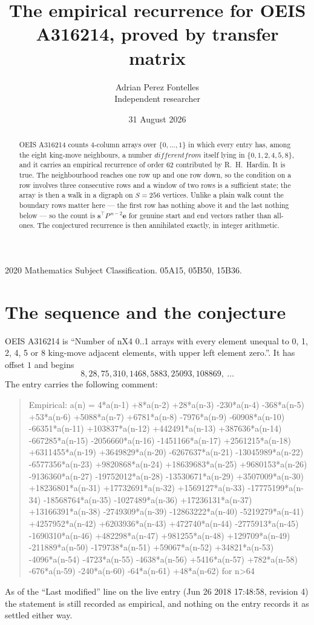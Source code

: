\documentclass[11pt,a4paper]{article}
\title{The empirical recurrence for OEIS A316214, proved by transfer matrix}
\author{Adrian Perez Fontelles\\ \small Independent researcher}
\date{31 August 2026}
\theoremstyle{plain}
\theoremstyle{definition}
\begin{document}
\maketitle

\begin{abstract}
OEIS A316214 counts $4$-column arrays over $\{0,\dots,1\}$ in which every entry has,
among the eight king-move neighbours, a number $different from$ itself lying in $\{0,1,2,4,5,8\}$, and it carries an empirical
recurrence of order $62$ contributed by R.~H.~Hardin. It is true. The neighbourhood
reaches one row up and one row down, so the condition on a row involves three consecutive
rows and a window of two rows is a sufficient state; the array is then a walk in a digraph
on $S=256$ vertices. Unlike a plain walk count the boundary rows matter here --- the first
row has nothing above it and the last nothing below --- so the count is
$\mathbf{s}^{\!\top}P^{\,n-2}\mathbf{e}$ for genuine start and end vectors rather than
all-ones. The conjectured recurrence is then annihilated exactly, in integer arithmetic.
\end{abstract}

\noindent\small 2020 Mathematics Subject Classification. 05A15, 05B50, 15B36.\normalsize

\section{The sequence and the conjecture}

OEIS A316214 is ``Number of nX4 0..1 arrays with every element unequal to 0, 1, 2, 4, 5 or 8 king-move adjacent elements, with upper left element zero.''. It has offset
$1$ and begins
\[
8, 28, 75, 310, 1468, 5883, 25093, 108869,\ \dots
\]
The entry carries the following comment:
\begin{quote}\small
Empirical: a(n) = 4*a(n-1) +8*a(n-2) +28*a(n-3) -230*a(n-4) -368*a(n-5) +53*a(n-6) +5088*a(n-7) +6781*a(n-8) -7976*a(n-9) -60908*a(n-10) -66351*a(n-11) +103837*a(n-12) +442491*a(n-13) +387636*a(n-14) -667285*a(n-15) -2056660*a(n-16) -1451166*a(n-17) +2561215*a(n-18) +6311455*a(n-19) +3649829*a(n-20) -6267637*a(n-21) -13045989*a(n-22) -6577356*a(n-23) +9820868*a(n-24) +18639683*a(n-25) +9680153*a(n-26) -9136360*a(n-27) -19752012*a(n-28) -13530671*a(n-29) +3507009*a(n-30) +18236801*a(n-31) +17732691*a(n-32) +1569127*a(n-33) -17775199*a(n-34) -18568764*a(n-35) -1027489*a(n-36) +17236131*a(n-37) +13166391*a(n-38) -2749309*a(n-39) -12863222*a(n-40) -5219279*a(n-41) +4257952*a(n-42) +6203936*a(n-43) +472740*a(n-44) -2775913*a(n-45) -1690310*a(n-46) +482298*a(n-47) +981255*a(n-48) +129709*a(n-49) -211889*a(n-50) -179738*a(n-51) +59067*a(n-52) +34821*a(n-53) -4096*a(n-54) -4723*a(n-55) -4638*a(n-56) +5416*a(n-57) +782*a(n-58) -676*a(n-59) -240*a(n-60) -64*a(n-61) +48*a(n-62) for n>64
\end{quote}
As of the ``Last modified'' line on the live entry (Jun 26 2018 17:48:58, revision
4) the statement is still recorded as empirical, and nothing on the entry
records it as settled either way.
\end{document}
